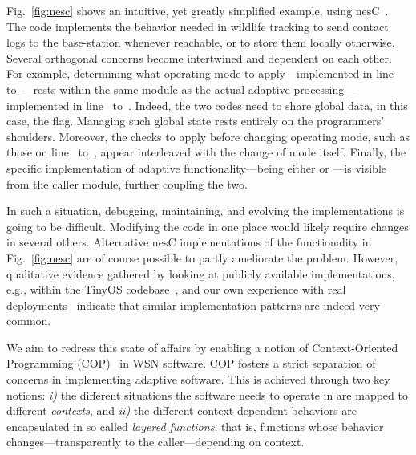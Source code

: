 
Fig.~\ref{fig:nesc} shows an intuitive, yet greatly simplified
example, using nesC~\cite{gay03nesc}. The code implements the behavior needed
in wildlife tracking to send contact logs to the base-station whenever
reachable, or to store them locally otherwise. Several orthogonal
concerns become intertwined and dependent on each other. For example,
determining what operating mode to apply---implemented in
line~ to~---rests within the same
module as the actual adaptive processing---implemented in
line~ to~. Indeed, the two codes need to
share global data, in this case, the 
flag. Managing such global state rests entirely on the programmers'
shoulders. Moreover, the checks to apply before changing operating
mode, such as those on line~ to~, appear
interleaved with the change of mode itself. Finally, the specific
implementation of adaptive functionality---being either
 or ---is visible from the caller
module, further coupling the two.

In such a situation, debugging, maintaining, and evolving the
implementations is going to be difficult. Modifying the code in one
place would likely require changes in several others. Alternative nesC
implementations of the functionality in Fig.~\ref{fig:nesc} are of
course possible to partly ameliorate the problem. However, qualitative
evidence gathered by looking at publicly available implementations,
e.g., within the TinyOS codebase~\cite{tinyos}, and our own experience
with real deployments~\cite{ceriotti11:light,ceriotti09:monitoring}
indicate that similar implementation patterns are indeed very common.


 We aim to redress this state of
affairs by enabling a notion of Context-Oriented Programming
(COP)~\cite{} in WSN software. COP fosters a strict separation of
concerns in implementing adaptive software. This is achieved through
two key notions: \emph{i)} the different situations the software needs
to operate in are mapped to different \emph{contexts}, and \emph{ii)}
the different context-dependent behaviors are encapsulated in so
called \emph{layered functions}, that is, functions whose behavior
changes---transparently to the caller---depending on context.

